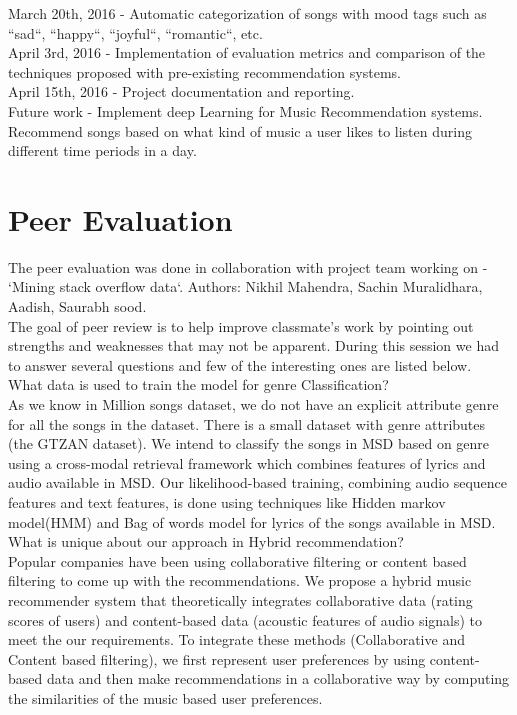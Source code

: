 \documentclass{sig-alternate-05-2015}
\begin{document}
March 20th, 2016 - Automatic categorization of  songs with mood tags such as ``sad``, ``happy``, ``joyful``, ``romantic``, etc.\\

April 3rd, 2016 - Implementation of evaluation metrics and comparison of the techniques proposed with pre-existing recommendation systems.\\

April 15th, 2016 - Project documentation and reporting.\\

Future work - Implement deep Learning for Music Recommendation systems. Recommend songs based on what kind of music a user likes to listen during different time periods in a day.\\

\section{Peer Evaluation}

The peer evaluation was done in collaboration with project team working on - `Mining stack overflow data`. Authors: Nikhil Mahendra, Sachin Muralidhara, Aadish, Saurabh sood.\\

The goal of peer review is to help improve classmate's work by pointing out strengths and weaknesses that may not be apparent. During this session we had to answer several questions and few of the interesting ones are listed below.\\

What data is used to train the model for genre Classification? \\

As we know in Million songs dataset, we do not have an explicit attribute genre for all the songs in the dataset. There is a small dataset with genre attributes (the GTZAN dataset). We intend to classify the songs in MSD based on genre using a cross-modal retrieval framework which combines features of lyrics and audio available in MSD. Our likelihood-based training, combining audio sequence features and text features, is done using techniques like Hidden markov model(HMM) and Bag of words model for lyrics of the songs available in MSD.\\

What is unique about our approach in Hybrid recommendation? \\

Popular companies have been using collaborative filtering or content based filtering to come up with the recommendations. We propose a hybrid music recommender system that theoretically integrates collaborative data (rating scores of users) and content-based data (acoustic features of audio signals) to meet the our requirements. To integrate these methods (Collaborative and Content based filtering), we first represent user preferences by using content-based data and then make recommendations in a collaborative way by computing the similarities of the music based user preferences.\\
\end{document}
